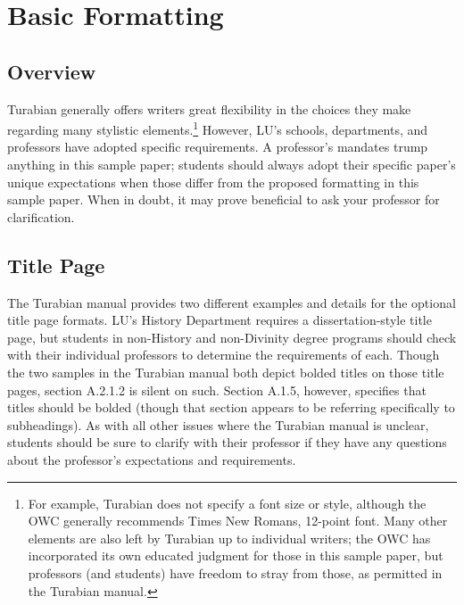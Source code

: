 \documentclass[raggedright]{turabian-researchpaper}
\begin{document}
\section{Basic Formatting}

\subsection{Overview}

Turabian generally offers writers great flexibility in the choices they make
regarding many stylistic elements.\footnote{For example, Turabian does not
specify a font size or style, although the OWC generally recommends Times New
Romans, 12-point font. Many other elements are also left by Turabian up to
individual writers; the OWC has incorporated its own educated judgment for those
in this sample paper, but professors (and students) have freedom to stray from
those, as permitted in the Turabian manual.} However, LU's schools, departments,
and professors have adopted specific requirements. A professor's mandates trump
anything in this sample paper; students should always adopt their specific
paper's unique expectations when those differ from the proposed formatting in
this sample paper. When in doubt, it may prove beneficial to ask your professor
for clarification.

\subsection{Title Page}

The Turabian manual provides two different examples and details for the optional
title page formats.\autocite[377-76]{Turabian} LU's History Department requires
a dissertation-style title page, but students in non-History and non-Divinity
degree programs should check with their individual professors to determine the
requirements of each. Though the two samples in the Turabian
manual\autocite[376]{Turabian} both depict bolded titles on those title pages,
section A.2.1.2\autocite[376]{Turabian} is silent on such. Section A.1.5,
however, specifies that titles should be bolded (though that section appears to
be referring specifically to subheadings).\autocite[374-75]{Turabian} As with
all other issues where the Turabian manual is unclear, students should be sure
to clarify with their professor if they have any questions about the professor's
expectations and requirements.
\end{document}
